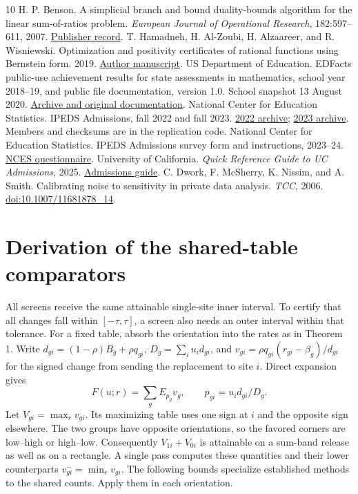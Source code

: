 \documentclass[11pt]{article}
\begin{document}
\begin{thebibliography}{10}
 H. P. Benson. A simplicial branch and bound duality-bounds algorithm for the linear sum-of-ratios problem. \emph{European Journal of Operational Research}, 182:597--611, 2007. \href{https://doi.org/10.1016/j.ejor.2006.08.036}{Publisher record}.
 T. Hamadneh, H. Al-Zoubi, H. Alzaareer, and R. Wisniewski. Optimization and positivity certificates of rational functions using Bernstein form. 2019. \href{https://arxiv.org/abs/1906.11037}{Author manuscript}.
 US Department of Education. EDFacts public-use achievement results for state assessments in mathematics, school year 2018--19, and public file documentation, version 1.0. School snapshot 13 August 2020. \href{https://www.eddatacenter.org/edfacts}{Archive and original documentation}.
 National Center for Education Statistics. IPEDS Admissions, fall 2022 and fall 2023. \href{https://nces.ed.gov/ipeds/datacenter/data/ADM2022.zip}{2022 archive}; \href{https://nces.ed.gov/ipeds/datacenter/data/ADM2023.zip}{2023 archive}. Members and checksums are in the replication code.
 National Center for Education Statistics. IPEDS Admissions survey form and instructions, 2023--24. \href{https://nces.ed.gov/ipeds/use-the-data/download-survey-material/2023/admissions/package_14_102.pdf}{NCES questionnaire}.
 University of California. \emph{Quick Reference Guide to UC Admissions}, 2025. \href{https://admission.universityofcalifornia.edu/counselors/_files/documents/quick-reference-guide-to-uc-admissions.pdf}{Admissions guide}.
 C. Dwork, F. McSherry, K. Nissim, and A. Smith. Calibrating noise to sensitivity in private data analysis. \emph{TCC}, 2006. \href{https://doi.org/10.1007/11681878_14}{doi:10.1007/11681878\_14}.
\end{thebibliography}
\clearpage
\appendix
\section{Derivation of the shared-table comparators}\label{sec:competitors}
All screens receive the same attainable single-site inner interval. To certify that all changes fall within $[-\tau,\tau]$, a screen also needs an outer interval within that tolerance. For a fixed table, absorb the orientation into the rates as in Theorem 1. Write $d_{gi}=(1-\rho)B_g+\rho q_{gi}$, $D_g=\sum_i u_i d_{gi}$, and $v_{gi}=\rho q_{gi}(r_{gi}-\beta_g)/d_{gi}$ for the signed change from sending the replacement to site $i$. Direct expansion gives
\[
 F(u;r)=\sum_g E_{p_g}v_g,\qquad p_{gi}=u_i d_{gi}/D_g .
\]
Let $V_{gi}=\max_r v_{gi}$. Its maximizing table uses one sign at $i$ and the opposite sign elsewhere. The two groups have opposite orientations, so the favored corners are low--high or high--low. Consequently $V_{1i}+V_{0i}$ is attainable on a sum-band release as well as on a rectangle. A single pass computes these quantities and their lower counterparts $v^-_{gi}=\min_r v_{gi}$. The following bounds specialize established methods to the shared counts. Apply them in each orientation.
\end{document}
